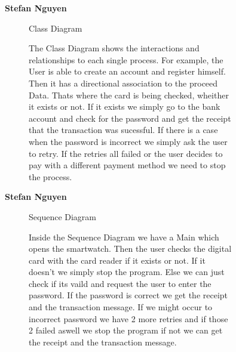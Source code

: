 \documentclass{article}
\begin{document}
	\begin{figure}[htbp]
		\textbf{Stefan Nguyen}
		\centering
		\begin{subfigure}{\textwidth}
			\resizebox{\textwidth}{!}{}
			\caption{Class Diagram}
		\end{subfigure}
		\begin{subfigure}{\textwidth}
			The Class Diagram shows the interactions and relationships to each single process. For example, the User is
			able to create an account and register himself. Then it has a directional association to the proceed Data. Thats
			where the card is being checked, wheither it exists or not. If it exists we simply go to the bank account and check 
			for the password and get the receipt that the transaction was sucessful. If there is a case when the password is 
			incorrect we simply ask the user to retry. If the retries all failed or the user decides to pay with a different 
			payment method we need to stop the process. 
		\end{subfigure}
	\end{figure}
	\newpage

	\begin{figure}[htbp]
		\textbf{Stefan Nguyen}
		\centering
		\begin{subfigure}{\textwidth}
			\resizebox{\textwidth}{!}{}
			\caption{Sequence Diagram}
		\end{subfigure}
		\begin{subfigure}{\textwidth}
			Inside the Sequence Diagram we have a Main which opens the smartwatch. Then the user checks the digital card with the 
			card reader if it exists or not. If it doesn't we simply stop the program. Else we can just check if its vaild and request the 
			user to enter the password. If the password is correct we get the receipt and the transaction message. If we might occur to incorrect 
			password we have 2 more retries and if those 2 failed aswell we stop the program if not we can get the receipt and the transaction
			message. 
		\end{subfigure}
	\end{figure}
	\newpage
\end{document}
